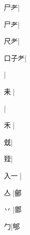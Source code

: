 \begin{multicols}{2}
{{\cjk{}{\cnsym{}　}尸耂}|{}\par
{\cjk{}{\cnsym{}　}尸耂}|{}\par
{\cjk{}{\cnsym{}　}尺耂}|{}\par
{\cjk{}口子耂}|{}\par
{}|{}\par
{\cjk{}{\cnsym{}　}耒{\cnxJzr{}}}|{}\par
{}|{}\par
{\cjk{}{\cnsym{}　}禾{\cnxJzr{}}}|{}\par
{\cjk{}{\cnsym{}　}{\cnsym{}　}兓}|{}\par
{\cjk{}{\cnsym{}　}{\cnsym{}　}臸}|{}\par
{\cjk{}入一{\cnjzr{}}}|{}\par
{\cjk{}{\cnsym{}　}亼{\cnjzr{}}}|{\cjk{}鄶}\par
{\cjk{}{\cnsym{}　}丷{\cnjzr{}}}|{\cjk{}鄫}\par
{\cjk{}{\cnsym{}　}{\cnsym{}　}勹}|{\cjk{}郇}\par
}
\end{multicols}
